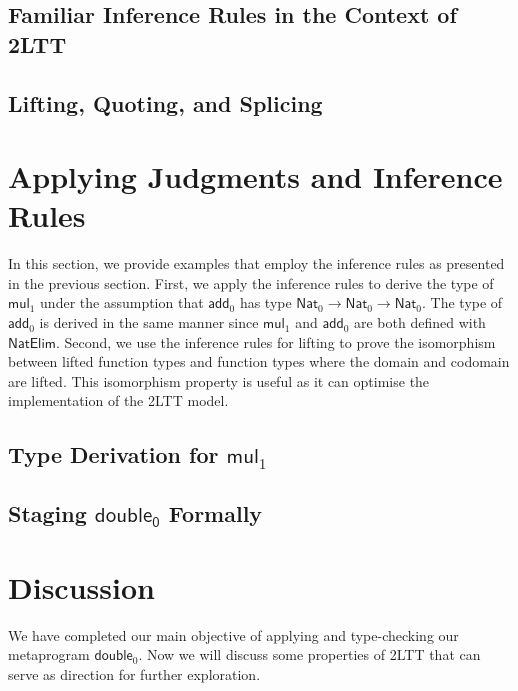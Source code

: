 \documentclass{article}
\begin{document}
\subsection{Familiar Inference Rules in the Context of 2LTT}




\subsection{Lifting, Quoting, and Splicing}




\section{Applying Judgments and Inference Rules}
In this section, we provide examples that employ the inference rules as presented in the previous section. First, we apply the inference rules to derive the type of $\mathsf{mul}_1$ under the assumption that $\mathsf{add}_0$ has type $\mathsf{Nat}_0\to\mathsf{Nat}_0\to\mathsf{Nat}_0$. The type of $\mathsf{add}_0$ is derived in the same manner since $\mathsf{mul}_1$ and $\mathsf{add}_0$ are both defined with $\mathsf{NatElim}$. Second, we use the inference rules for lifting to prove the isomorphism between lifted function types and function types where the domain and codomain are lifted. This isomorphism property is useful as it can optimise the implementation of the 2LTT model.


\subsection{Type Derivation for $\mathsf{mul}_1$}



\subsection{Staging $\mathsf{double_0}$ Formally}



\section{Discussion}
We have completed our main objective of applying and type-checking our metaprogram $\mathsf{double}_0$. Now we will discuss some properties of 2LTT that can serve as direction for further exploration.
\end{document}

